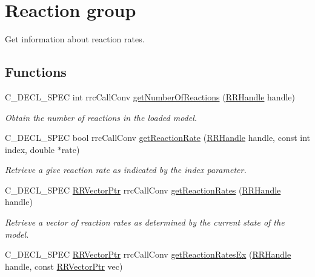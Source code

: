 \hypertarget{group__reaction}{\section{Reaction group}
\label{group__reaction}
}


Get information about reaction rates.  


\subsection*{Functions}
\begin{DoxyCompactItemize}
\item 
C\-\_\-\-D\-E\-C\-L\-\_\-\-S\-P\-E\-C int rrc\-Call\-Conv \hyperlink{group__reaction_gaaa9941b7cba362c4098feedb02b047a4}{get\-Number\-Of\-Reactions} (\hyperlink{rrc__types_8h_a1d68f0592372208fa5a5f2799ea4b3ae}{R\-R\-Handle} handle)
\begin{DoxyCompactList}\small\item\em Obtain the number of reactions in the loaded model. \end{DoxyCompactList}\item 
C\-\_\-\-D\-E\-C\-L\-\_\-\-S\-P\-E\-C bool rrc\-Call\-Conv \hyperlink{group__reaction_ga6fbbae97760afea7cc74e26e2cb74926}{get\-Reaction\-Rate} (\hyperlink{rrc__types_8h_a1d68f0592372208fa5a5f2799ea4b3ae}{R\-R\-Handle} handle, const int index, double $\ast$rate)
\begin{DoxyCompactList}\small\item\em Retrieve a give reaction rate as indicated by the index parameter. \end{DoxyCompactList}\item 
C\-\_\-\-D\-E\-C\-L\-\_\-\-S\-P\-E\-C \hyperlink{rrc__types_8h_a3be72d6006034fd349f753d2bf441bf7}{R\-R\-Vector\-Ptr} rrc\-Call\-Conv \hyperlink{group__reaction_gae0d748f8af83914cc078f8728d67ed0e}{get\-Reaction\-Rates} (\hyperlink{rrc__types_8h_a1d68f0592372208fa5a5f2799ea4b3ae}{R\-R\-Handle} handle)
\begin{DoxyCompactList}\small\item\em Retrieve a vector of reaction rates as determined by the current state of the model. \end{DoxyCompactList}\item 
C\-\_\-\-D\-E\-C\-L\-\_\-\-S\-P\-E\-C \hyperlink{rrc__types_8h_a3be72d6006034fd349f753d2bf441bf7}{R\-R\-Vector\-Ptr} rrc\-Call\-Conv \hyperlink{group__reaction_ga106854f50f9896130fb77f64f2c5885c}{get\-Reaction\-Rates\-Ex} (\hyperlink{rrc__types_8h_a1d68f0592372208fa5a5f2799ea4b3ae}{R\-R\-Handle} handle, const \hyperlink{rrc__types_8h_a3be72d6006034fd349f753d2bf441bf7}{R\-R\-Vector\-Ptr} vec)

\end{DoxyCompactItemize}
